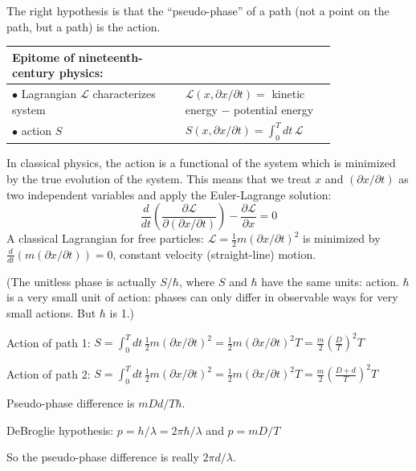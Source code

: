 \documentclass[12pt]{article}
\begin{document}
The right hypothesis is that the ``pseudo-phase'' of a path (not a
point on the path, but a path) is the action.
\begin{center}
  \begin{tabular}{p{0.45\linewidth} p{0.35\linewidth}}
    Epitome of nineteenth-century physics: \\\hline
    $\bullet$ Lagrangian $\mathcal{L}$ characterizes system & $\mathcal{L}(x,
    \partial x / \partial t) =$ kinetic energy $-$ potential energy \\
    $\bullet$ action $S$ & $\displaystyle S(x, \partial x / \partial t) = \int_0^T dt \,
    \mathcal{L}$ \\
  \end{tabular}
\end{center}
In classical physics, the action is a functional of the system which
is minimized by the true evolution of the system.  This means that we
treat $x$ and $(\partial x / \partial t)$ as two independent variables
and apply the Euler-Lagrange solution:
\begin{equation}
  \frac{d}{dt} \left( \frac{\partial \mathcal{L}}{\partial (\partial x
  / \partial t)} \right) - \frac{\partial \mathcal{L}}{\partial x} = 0
\end{equation}
A classical Lagrangian for free particles: $\mathcal{L} = \frac{1}{2}
m (\partial x / \partial t)^2$ is minimized by $\frac{d}{dt} \left( m
(\partial x / \partial t) \right) = 0$, constant velocity
(straight-line) motion.

(The unitless phase is actually $S/\hbar$, where $S$ and $\hbar$ have
the same units: action.  $\hbar$ is a very small unit of action:
phases can only differ in observable ways for very small actions.  But
$\hbar$ is 1.)

Action of path 1: $\displaystyle S = \int_0^T dt \, \frac{1}{2} m
(\partial x / \partial t)^2 = \frac{1}{2} m (\partial x / \partial
t)^2 T = \frac{m}{2} \left(\frac{D}{T}\right)^2 T$

\smallskip

Action of path 2: $\displaystyle S = \int_0^T dt \, \frac{1}{2} m
(\partial x / \partial t)^2 = \frac{1}{2} m (\partial x / \partial
t)^2 T = \frac{m}{2} \left(\frac{D + d}{T}\right)^2 T$

Pseudo-phase difference is $m D d / T \hbar$.

DeBroglie hypothesis: $p = h / \lambda = 2 \pi \hbar / \lambda$ and $p
= m D / T$

So the pseudo-phase difference is really $2 \pi d / \lambda$.
\end{document}

